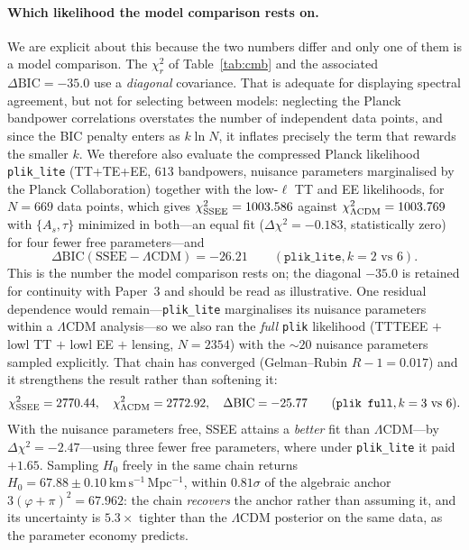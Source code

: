 \documentclass[aps,prd,preprint,amsmath,amssymb,nofootinbib,longbibliography]{revtex4-2}
\newcommand{\kms}{\mathrm{km\,s^{-1}\,Mpc^{-1}}}
\begin{document}
\paragraph{Which likelihood the model comparison rests on.} We are explicit
about this because the two numbers differ and only one of them is a model
comparison. The $\chi^2_r$ of Table~\ref{tab:cmb} and the associated
$\Delta\mathrm{BIC}=-35.0$ use a \emph{diagonal} covariance. That is adequate
for displaying spectral agreement, but not for selecting between models:
neglecting the Planck bandpower correlations overstates the number of
independent data points, and since the BIC penalty enters as $k\ln N$, it
inflates precisely the term that rewards the smaller $k$. We therefore also
evaluate the compressed Planck likelihood \texttt{plik\_lite}
(TT+TE+EE, $613$ bandpowers, nuisance parameters marginalised by the Planck
Collaboration) together with the low-$\ell$ TT and EE likelihoods, for $N=669$
data points, which gives $\chi^2_{\rm SSEE}=1003.586$ against
$\chi^2_{\Lambda\rm CDM}=1003.769$ with $\{A_s,\tau\}$ minimized in both---an
equal fit ($\Delta\chi^2=-0.183$, statistically zero) for four fewer free
parameters---and
\begin{equation}
  \label{eq:dbic-cmb}
  \Delta\mathrm{BIC}(\text{SSEE}-\Lambda\text{CDM}) = -26.21 \qquad
  (\texttt{plik\_lite}, k=2 \text{ vs } 6) .
\end{equation}
This is the number the model comparison rests on; the diagonal $-35.0$ is
retained for continuity with Paper~3 and should be read as illustrative. One
residual dependence would remain---\texttt{plik\_lite} marginalises its nuisance
parameters within a $\Lambda$CDM analysis---so we also ran the \emph{full}
\texttt{plik} likelihood (TTTEEE $+$ lowl TT $+$ lowl EE $+$ lensing,
$N=2354$) with the ${\sim}20$ nuisance parameters sampled explicitly. That chain
has converged (Gelman--Rubin $R-1=0.017$) and it strengthens the result rather
than softening it:
\begin{equation}
  \label{eq:dbic-full}
  \chi^2_{\rm SSEE}=2770.44 , \quad \chi^2_{\Lambda\rm CDM}=2772.92 , \quad
  \Delta\mathrm{BIC}=-25.77 \qquad (\texttt{plik full}, k=3 \text{ vs } 6) .
\end{equation}
With the nuisance parameters free, SSEE attains a \emph{better} fit than
$\Lambda$CDM---by $\Delta\chi^2=-2.47$---using three fewer free parameters,
where under \texttt{plik\_lite} it paid $+1.65$. Sampling $H_0$ freely in the
same chain returns $H_0=67.88\pm0.10~\kms$, within $0.81\sigma$ of the algebraic
anchor $3(\varphi+\pi)^2=67.962$: the chain \emph{recovers} the anchor rather
than assuming it, and its uncertainty is $5.3\times$ tighter than the
$\Lambda$CDM posterior on the same data, as the parameter economy predicts.
\end{document}
